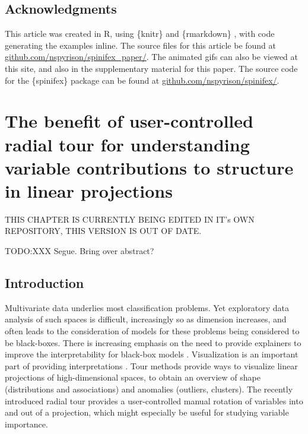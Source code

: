 \documentclass{template/monashthesis}
\begin{document}
\hypertarget{acknowledgments-1}{%
\section{Acknowledgments}\label{acknowledgments-1}}

This article was created in R, using \{knitr\} \autocite{xie_knitr_2020} and \{rmarkdown\} \autocite{allaire_rmarkdown_2020}, with code generating the examples inline. The source files for this article be found at \href{https://github.com/nspyrison/spinifex_paper/}{github.com/nspyrison/spinifex\_paper/}. The animated gifs can also be viewed at this site, and also in the supplementary material for this paper. The source code for the \{spinifex\} package can be found at \href{https://github.com/nspyrison/spinifex/}{github.com/nspyrison/spinifex/}.

\hypertarget{ch:efficacy_radial_tour}{%
\chapter{The benefit of user-controlled radial tour for understanding variable contributions to structure in linear projections}\label{ch:efficacy_radial_tour}}

THIS CHAPTER IS CURRENTLY BEING EDITED IN IT's OWN REPOSITORY, THIS VERSION IS OUT OF DATE.

TODO:XXX Segue. Bring over abstract?

\hypertarget{introduction-1}{%
\section{Introduction}\label{introduction-1}}

Multivariate data underlies most classification problems. Yet exploratory data analysis \autocite[EDA,][]{tukey_exploratory_1977} of such spaces is difficult, increasingly so as dimension increases, and often leads to the consideration of models for these problems being considered to be black-boxes. There is increasing emphasis on the need to provide explainers to improve the interpretability for black-box models \autocite{biecek_dalex_2018,biecek_explanatory_2021,lundberg_unified_2017,ribeiro_why_2016,wickham_visualizing_2015}. Visualization is an important part of providing interpretations \autocite{anscombe_graphs_1973,coleman_geometric_1986,goodman_dirty_2008,matejka_same_2017}. Tour methods \autocite{lee_review_2021,cook_grand_2008} provide ways to visualize linear projections of high-dimensional spaces, to obtain an overview of shape (distributions and associations) and anomalies (outliers, clusters). The recently introduced radial tour \autocite{spyrison_spinifex_2020} provides a user-controlled manual rotation of variables into and out of a projection, which might especially be useful for studying variable importance.
\end{document}
